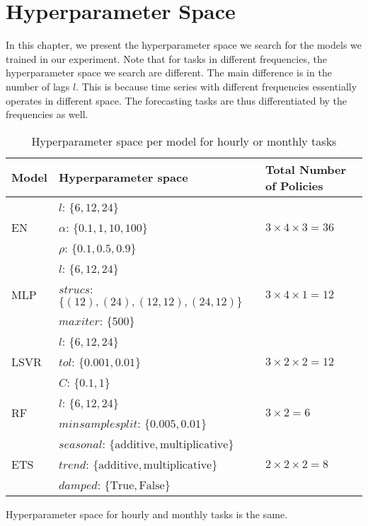 \chapter{Hyperparameter Space}\label{apdx: hyper space}
In this chapter, we present the hyperparameter space we search for the models we trained in our experiment. Note that for tasks in different frequencies, the hyperparameter space we search are different. The main difference is in the number of lags $l$. This is because time series with different frequencies essentially operates in different space. The forecasting tasks are thus differentiated by the frequencies as well.

\begin{center}
    \begin{table}[h!]
        \begin{tabular}{|l|l|l|} 
            \hline
            Model & Hyperparameter space & Total Number of Policies \\
            \hline\hline
            \multirow{3}{*}{EN}   & $l$: $\{6, 12, 24 \}$ & \multirow{3}{*}{$3 \times 4 \times 3 = 36$} \\
                                  & $\alpha$: $\{0.1, 1, 10, 100\}$ & \\
                                  & $\rho$: $\{0.1, 0.5, 0.9 \}$ & \\
            \hline
            \multirow{3}{*}{MLP}  & $l$: $\{6, 12, 24 \}$ & \multirow{3}{*}{$3 \times 4 \times 1 = 12$} \\
                                  & $strucs$: $\{(12), (24), (12, 12), (24, 12)\}$ & \\
                                  & $maxiter$: $\{ 500\}$ & \\
            \hline
            \multirow{3}{*}{LSVR} & $l$: $\{6, 12, 24 \}$ & \multirow{3}{*}{$3 \times 2 \times 2 = 12$} \\
                                  & $tol$: $\{0.001, 0.01\}$ & \\
                                  & $C$: $\{0.1, 1\}$ & \\
            \hline
            \multirow{2}{*}{RF}   & $l$: $\{6, 12, 24 \}$ & \multirow{2}{*}{$3 \times 2 = 6$} \\
                                  & $min sample split$: $\{0.005, 0.01\}$ & \\
            \hline
            \multirow{3}{*}{ETS}  & $seasonal$: $\{\text{additive}, \text{multiplicative}\}$ & \multirow{3}{*}{$2 \times 2 \times 2 = 8$}  \\
                                  & $trend$: $\{\text{additive}, \text{multiplicative}\}$ & \\
                                  & $damped$: $\{\text{True}, \text{False}\}$ & \\
            \hline
        \end{tabular}
        \caption{ Hyperparameter space per model for hourly or monthly tasks}
        {\raggedright Hyperparameter space for hourly and monthly tasks is the same.\par}
        \label{tbl: hyper space hourly/monthly}
    \end{table}
\end{center}

